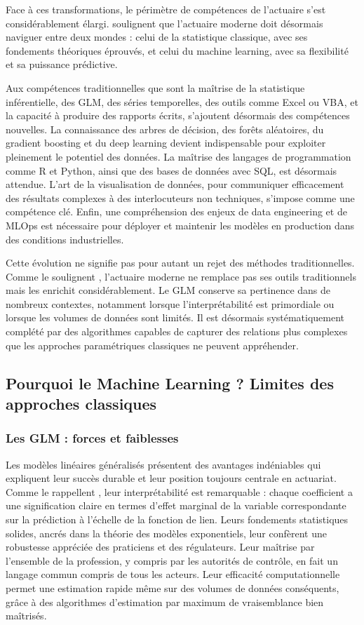 \documentclass[
  french,
]{book}
\theoremstyle{definition}
\theoremstyle{definition}
\theoremstyle{definition}
\theoremstyle{definition}
\theoremstyle{remark}
\begin{document}
Face à ces transformations, le périmètre de compétences de l'actuaire s'est considérablement élargi. \citet{delong2021gamma} soulignent que l'actuaire moderne doit désormais naviguer entre deux mondes : celui de la statistique classique, avec ses fondements théoriques éprouvés, et celui du machine learning, avec sa flexibilité et sa puissance prédictive.

Aux compétences traditionnelles que sont la maîtrise de la statistique inférentielle, des GLM, des séries temporelles, des outils comme Excel ou VBA, et la capacité à produire des rapports écrits, s'ajoutent désormais des compétences nouvelles. La connaissance des arbres de décision, des forêts aléatoires, du gradient boosting et du deep learning devient indispensable pour exploiter pleinement le potentiel des données. La maîtrise des langages de programmation comme R et Python, ainsi que des bases de données avec SQL, est désormais attendue. L'art de la visualisation de données, pour communiquer efficacement des résultats complexes à des interlocuteurs non techniques, s'impose comme une compétence clé. Enfin, une compréhension des enjeux de data engineering et de MLOps est nécessaire pour déployer et maintenir les modèles en production dans des conditions industrielles.

Cette évolution ne signifie pas pour autant un rejet des méthodes traditionnelles. Comme le soulignent \citet{denuit2019effective}, l'actuaire moderne ne remplace pas ses outils traditionnels mais les enrichit considérablement. Le GLM conserve sa pertinence dans de nombreux contextes, notamment lorsque l'interprétabilité est primordiale ou lorsque les volumes de données sont limités. Il est désormais systématiquement complété par des algorithmes capables de capturer des relations plus complexes que les approches paramétriques classiques ne peuvent appréhender.

\subsection{Pourquoi le Machine Learning ? Limites des approches classiques}

\subsubsection{Les GLM : forces et faiblesses}

Les modèles linéaires généralisés présentent des avantages indéniables qui expliquent leur succès durable et leur position toujours centrale en actuariat. Comme le rappellent \citet{hastie2009elements}, leur interprétabilité est remarquable : chaque coefficient a une signification claire en termes d'effet marginal de la variable correspondante sur la prédiction à l'échelle de la fonction de lien. Leurs fondements statistiques solides, ancrés dans la théorie des modèles exponentiels, leur confèrent une robustesse appréciée des praticiens et des régulateurs. Leur maîtrise par l'ensemble de la profession, y compris par les autorités de contrôle, en fait un langage commun compris de tous les acteurs. Leur efficacité computationnelle permet une estimation rapide même sur des volumes de données conséquents, grâce à des algorithmes d'estimation par maximum de vraisemblance bien maîtrisés.
\end{document}
